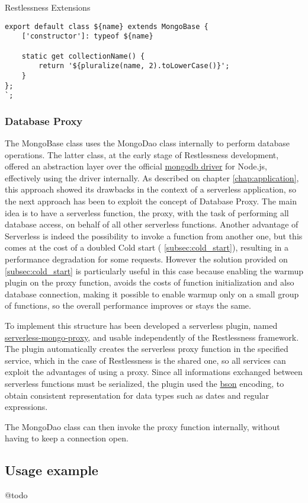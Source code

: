 \begin{chapter}{Restlessness Extensions}
\begin{lstlisting}[caption=modelTemplate function definition, label={lst:model_template}]
export default class ${name} extends MongoBase {
    ['constructor']: typeof ${name}

    static get collectionName() {
        return '${pluralize(name, 2).toLowerCase()}';
    }
};
`;
    \end{lstlisting}

    \subsubsection{Database Proxy}
    \label{subsec:database_proxy}
    The MongoBase class uses the MongoDao class internally to perform database
    operations. The latter class, at the early stage of Restlessness development,
    offered an abstraction layer over the official
    \href{https://www.npmjs.com/package/mongodb}{mongodb driver} for Node.js,
    effectively using the driver internally.
    As described on chapter \ref{chap:application}, this approach showed its
    drawbacks in the context of a serverless application, so the next approach has
    been to exploit the concept of Database Proxy.
    The main idea is to have a serverless function, the proxy, with the task of
    performing all database access, on behalf of all other serverless functions.
    Another advantage of Serverless is indeed the possibility to invoke a function
    from another one, but this comes at the cost of a doubled Cold start (
    \ref{subsec:cold_start}), resulting in a performance degradation for some requests.
    However the solution provided on \ref{subsec:cold_start} is particularly useful in
    this case because enabling the warmup plugin on the proxy function, avoids the
    costs of function initialization and also database connection, making it possible
    to enable warmup only on a small group of functions, so the overall performance
    improves or stays the same.

    To implement this structure has been developed a serverless plugin, named
    \href{https://www.npmjs.com/package/serverless-mongo-proxy}{serverless-mongo-proxy},
    and usable independently of the Restlessness framework.
    The plugin automatically creates the serverless proxy function in the specified
    service, which in the case of Restlessness is the shared one, so all services
    can exploit the advantages of using a proxy.
    Since all informations exchanged between serverless functions must be serialized,
    the plugin used the \href{http://bsonspec.org/}{bson} encoding, to obtain consistent
    representation for data types such as dates and regular expressions.

    The MongoDao class can then invoke the proxy function internally, without having
    to keep a connection open.

    \subsection{Usage example}
    @todo

\end{chapter}